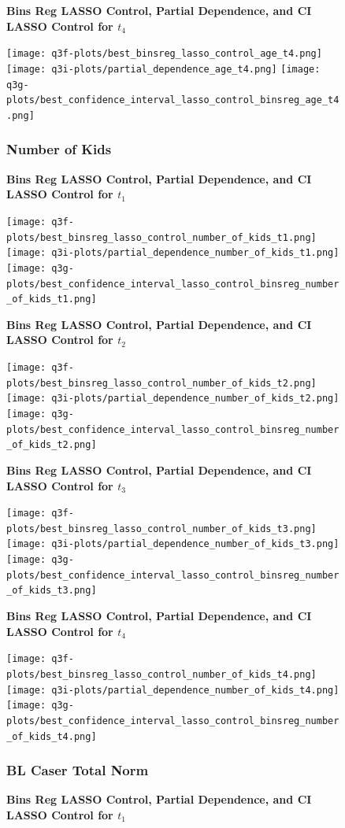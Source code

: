 \documentclass{article}
\begin{document}
{\begin{figure}[H]
  \textbf{Bins Reg LASSO Control, Partial Dependence, and CI LASSO Control for $t_4$}

  \texttt{[image: q3f-plots/best\_binsreg\_lasso\_control\_age\_t4.png]}
  \texttt{[image: q3i-plots/partial\_dependence\_age\_t4.png]}
  \texttt{[image: q3g-plots/best\_confidence\_interval\_lasso\_control\_binsreg\_age\_t4.png]}

\end{figure}
\begin{figure}[H]
  \subsubsection*{Number of Kids}
  \centering
  \textbf{Bins Reg LASSO Control, Partial Dependence, and CI LASSO Control for $t_1$}

  \texttt{[image: q3f-plots/best\_binsreg\_lasso\_control\_number\_of\_kids\_t1.png]}
  \texttt{[image: q3i-plots/partial\_dependence\_number\_of\_kids\_t1.png]}
  \texttt{[image: q3g-plots/best\_confidence\_interval\_lasso\_control\_binsreg\_number\_of\_kids\_t1.png]}

  \textbf{Bins Reg LASSO Control, Partial Dependence, and CI LASSO Control for $t_2$}

  \texttt{[image: q3f-plots/best\_binsreg\_lasso\_control\_number\_of\_kids\_t2.png]}
  \texttt{[image: q3i-plots/partial\_dependence\_number\_of\_kids\_t2.png]}
  \texttt{[image: q3g-plots/best\_confidence\_interval\_lasso\_control\_binsreg\_number\_of\_kids\_t2.png]}

  \textbf{Bins Reg LASSO Control, Partial Dependence, and CI LASSO Control for $t_3$}

  \texttt{[image: q3f-plots/best\_binsreg\_lasso\_control\_number\_of\_kids\_t3.png]}
  \texttt{[image: q3i-plots/partial\_dependence\_number\_of\_kids\_t3.png]}
  \texttt{[image: q3g-plots/best\_confidence\_interval\_lasso\_control\_binsreg\_number\_of\_kids\_t3.png]}

  \textbf{Bins Reg LASSO Control, Partial Dependence, and CI LASSO Control for $t_4$}

  \texttt{[image: q3f-plots/best\_binsreg\_lasso\_control\_number\_of\_kids\_t4.png]}
  \texttt{[image: q3i-plots/partial\_dependence\_number\_of\_kids\_t4.png]}
  \texttt{[image: q3g-plots/best\_confidence\_interval\_lasso\_control\_binsreg\_number\_of\_kids\_t4.png]}

\end{figure}
\begin{figure}[H]
  \subsubsection*{BL Caser Total Norm}
  \centering
  \textbf{Bins Reg LASSO Control, Partial Dependence, and CI LASSO Control for $t_1$}


\end{figure}}
\end{document}
